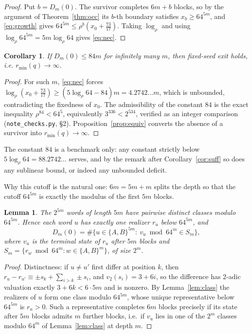 \documentclass[11pt,a4paper]{article}
\theoremstyle{plain}
\newtheorem{lemma}[theorem]{Lemma}
\newtheorem{corollary}[theorem]{Corollary}
\theoremstyle{definition}
\theoremstyle{remark}
\begin{document}
\begin{proof}
Put $b=D_m(0)$. The survivor completes $6m+b$ blocks, so by the argument of
Theorem~\ref{thm:occ} its $b$-th boundary satisfies $x_b\ge 64^{5m}$, and
\eqref{eq:growth} gives $64^{5m}\le\rho^{b}(x_0+\tfrac{73}{17})$. Taking
$\log_\rho$ and using $\log_\rho 64^{5m}=5m\log_\rho 64$ gives \eqref{eq:nec}.
\end{proof}

\begin{corollary}\label{cor:84}
If $D_m(0)\le 84m$ for infinitely many $m$, then fixed-seed exit holds, i.e.
$r_{\min}(q)\to\infty$.
\end{corollary}

\begin{proof}
For such $m$, \eqref{eq:nec} forces
$\log_\rho(x_0+\tfrac{73}{17})\ge (5\log_\rho 64-84)m=4.2742\ldots m$, which is
unbounded, contradicting the fixedness of $x_0$. The admissibility of the
constant $84$ is the exact inequality $\rho^{84}<64^{5}$, equivalently
$3^{336}<2^{534}$, verified as an integer comparison
(\texttt{note\_checks.py}, \S2). Proposition~\ref{prop:equiv} converts the
absence of a survivor into $r_{\min}(q)\to\infty$.
\end{proof}

The constant $84$ is a benchmark only: any constant strictly below
$5\log_\rho 64=88.2742\ldots$ serves, and by the remark after
Corollary~\ref{cor:suff} so does any sublinear bound, or indeed any unbounded
deficit.

Why this cutoff is the natural one: $6m=5m+m$ splits the depth so that the
cutoff $64^{5m}$ is exactly the modulus of the first $5m$ blocks.

\begin{lemma}\label{lem:onecand}
The $2^{5m}$ words of length $5m$ have pairwise distinct classes modulo
$64^{5m}$. Hence each word $u$ has exactly one realizer $r_u$ below $64^{5m}$,
and
\[
D_m(0)=\#\bigl\{u\in\{A,B\}^{5m}:\ v_u \bmod 64^{m}\in S_m\bigr\},
\]
where $v_u$ is the terminal state of $r_u$ after $5m$ blocks and
$S_m=\{r_w\bmod 64^m: w\in\{A,B\}^m\}$, of size $2^m$.
\end{lemma}

\begin{proof}
Distinctness: if $u\ne u'$ first differ at position $k$, then
$r_u-r_{u'}\equiv\pm s_k+\sum_{i>k}\pm s_i$, and $v_2(s_i)=3+6i$, so the
difference has $2$-adic valuation exactly $3+6k<6\cdot 5m$ and is nonzero. By
Lemma~\ref{lem:class} the realizers of $u$ form one class modulo $64^{5m}$,
whose unique representative below $64^{5m}$ is $r_u>0$. Such a representative
completes $6m$ blocks precisely if its state after $5m$ blocks admits $m$
further blocks, i.e.\ if $v_u$ lies in one of the $2^m$ classes modulo $64^m$
of Lemma~\ref{lem:class} at depth $m$.
\end{proof}
\end{document}
